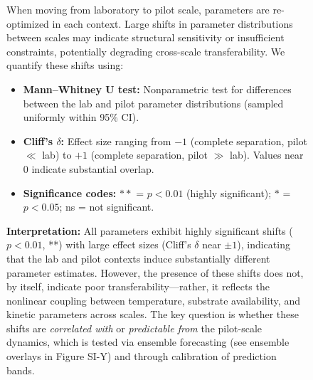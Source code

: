 \begin{figure}[H]
\centering
\small
When moving from laboratory to pilot scale, parameters are re-optimized in each context. 
Large shifts in parameter distributions between scales may indicate structural sensitivity 
or insufficient constraints, potentially degrading cross-scale transferability. We quantify 
these shifts using:

\begin{itemize}
  \item \textbf{Mann--Whitney U test:} Nonparametric test for differences between the 
        lab and pilot parameter distributions (sampled uniformly within 95\% CI).
  \item \textbf{Cliff's $\delta$:} Effect size ranging from $-1$ (complete separation, 
        pilot $\ll$ lab) to $+1$ (complete separation, pilot $\gg$ lab). Values near 0 
        indicate substantial overlap.
  \item \textbf{Significance codes:} $**$ = $p < 0.01$ (highly significant); 
        $*$ = $p < 0.05$; ns = not significant.
\end{itemize}

\textbf{Interpretation:}
All parameters exhibit highly significant shifts ($p < 0.01$, **) with large effect sizes 
(Cliff's $\delta$ near $\pm 1$), indicating that the lab and pilot contexts induce 
substantially different parameter estimates. However, the presence of these shifts does 
not, by itself, indicate poor transferability—rather, it reflects the nonlinear coupling 
between temperature, substrate availability, and kinetic parameters across scales. The key 
question is whether these shifts are \emph{correlated with} or \emph{predictable from} the 
pilot-scale dynamics, which is tested via ensemble forecasting (see ensemble overlays in 
Figure SI-Y) and through calibration of prediction bands.
\end{figure}

